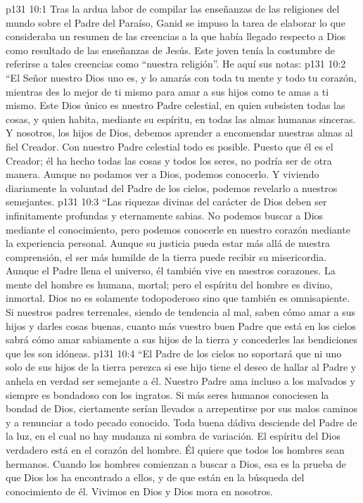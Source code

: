 \vs p131 10:1 Tras la ardua labor de compilar las enseñanzas de las religiones del mundo sobre el Padre del Paraíso, Ganid se impuso la tarea de elaborar lo que consideraba un resumen de las creencias a la que había llegado respecto a Dios como resultado de las enseñanzas de Jesús. Este joven tenía la costumbre de referirse a tales creencias como “nuestra religión”. He aquí sus notas:
\vs p131 10:2 \pc “El Señor nuestro Dios uno es, y lo amarás con toda tu mente y todo tu corazón, mientras des lo mejor de ti mismo para amar a sus hijos como te amas a ti mismo. Este Dios único es nuestro Padre celestial, en quien subsisten todas las cosas, y quien habita, mediante su espíritu, en todas las almas humanas sinceras. Y nosotros, los hijos de Dios, debemos aprender a encomendar nuestras almas al fiel Creador. Con nuestro Padre celestial todo es posible. Puesto que él es el Creador; él ha hecho todas las cosas y todos los seres, no podría ser de otra manera. Aunque no podamos ver a Dios, podemos conocerlo. Y viviendo diariamente la voluntad del Padre de los cielos, podemos revelarlo a nuestros semejantes.
\vs p131 10:3 “Las riquezas divinas del carácter de Dios deben ser infinitamente profundas y eternamente sabias. No podemos buscar a Dios mediante el conocimiento, pero podemos conocerle en nuestro corazón mediante la experiencia personal. Aunque su justicia pueda estar más allá de nuestra comprensión, el ser más humilde de la tierra puede recibir su misericordia. Aunque el Padre llena el universo, él también vive en nuestros corazones. La mente del hombre es humana, mortal; pero el espíritu del hombre es divino, inmortal. Dios no es solamente todopoderoso sino que también es omnisapiente. Si nuestros padres terrenales, siendo de tendencia al mal, saben cómo amar a sus hijos y darles cosas buenas, cuanto más vuestro buen Padre que está en los cielos sabrá cómo amar sabiamente a sus hijos de la tierra y concederles las bendiciones que les son idóneas.
\vs p131 10:4 “El Padre de los cielos no soportará que ni uno solo de sus hijos de la tierra perezca si ese hijo tiene el deseo de hallar al Padre y anhela en verdad ser semejante a él. Nuestro Padre ama incluso a los malvados y siempre es bondadoso con los ingratos. Si más seres humanos conociesen la bondad de Dios, ciertamente serían llevados a arrepentirse por sus malos caminos y a renunciar a todo pecado conocido. Toda buena dádiva desciende del Padre de la luz, en el cual no hay mudanza ni sombra de variación. El espíritu del Dios verdadero está en el corazón del hombre. Él quiere que todos los hombres sean hermanos. Cuando los hombres comienzan a buscar a Dios, esa es la prueba de que Dios los ha encontrado a ellos, y de que están en la búsqueda del conocimiento de él. Vivimos en Dios y Dios mora en nosotros.
